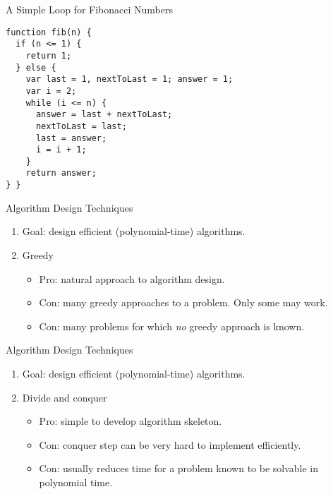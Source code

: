    \begin{frame}[fragile]{A Simple Loop for Fibonacci Numbers}


\begin{lstlisting}
function fib(n) {
  if (n <= 1) {
    return 1;
  } else {
    var last = 1, nextToLast = 1; answer = 1; 
    var i = 2;
    while (i <= n) {
      answer = last + nextToLast;
      nextToLast = last;
      last = answer;
      i = i + 1;
    }
    return answer;
} }
\end{lstlisting}
\end{frame}

   \begin{frame}[fragile]{Algorithm Design Techniques}

  \begin{enumerate}
  \item Goal: design efficient (polynomial-time) algorithms.
  \item Greedy
    \begin{itemize}
    \item Pro: natural approach to algorithm design.
    \item Con: many greedy approaches to a problem. Only some may work.
    \item Con: many problems for which \emph{no} greedy approach is known.
    \end{itemize}
  \end{enumerate}
\end{frame}

   \begin{frame}[fragile]{Algorithm Design Techniques}

  \begin{enumerate}
  \item Goal: design efficient (polynomial-time) algorithms.
  \item Divide and conquer
    \begin{itemize}
    \item Pro: simple to develop algorithm skeleton.
    \item Con: conquer step can be very hard to implement efficiently.
    \item Con: usually reduces time for a problem known to be solvable
      in polynomial time.    
    \end{itemize}
  \end{enumerate}
\end{frame}

